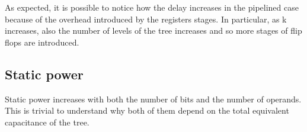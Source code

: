 As expected, it is possible to notice how the delay increases in the pipelined case because of the overhead introduced by the registers stages. In particular, as k increases, also the number of levels of the tree increases and so more stages of flip flops are introduced.

\subsection{Static power}

Static power increases with both the number of bits and  the number of operands. This is trivial to understand why both of them depend on the total equivalent capacitance of the tree.
\begin{figure}[H]
\end{figure}
